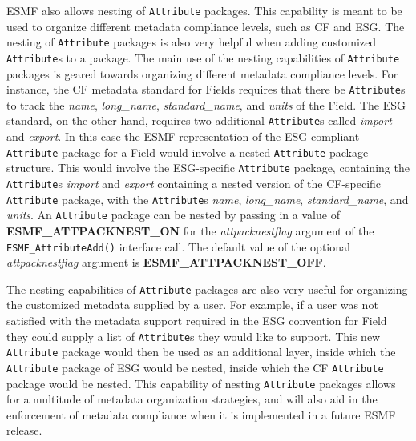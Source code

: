 \vspace{18pt}

ESMF also allows nesting of {\tt Attribute} packages.  This capability is meant to be used to organize different metadata compliance levels, such as CF and ESG.  The nesting of {\tt Attribute} packages is also very helpful when adding customized {\tt Attribute}s to a package.  The main use of the nesting capabilities of {\tt Attribute} packages is geared towards organizing different metadata compliance levels.  For instance, the CF metadata standard for Fields requires that there be {\tt Attribute}s to track the {\it name}, {\it long\_name}, {\it standard\_name}, and {\it units} of the Field.  The ESG standard, on the other hand, requires two additional {\tt Attribute}s called {\it import} and {\it export}.  In this case the ESMF representation of the ESG compliant {\tt Attribute} package for a Field would involve a nested {\tt Attribute} package structure.  This would involve the ESG-specific {\tt Attribute} package, containing the {\tt Attribute}s {\it import} and {\it export} containing a nested version of the CF-specific {\tt Attribute} package, with the {\tt Attribute}s {\it name}, {\it long\_name}, {\it standard\_name}, and {\it units}.  An {\tt Attribute} package can be nested by passing in a value of {\bf ESMF\_ATTPACKNEST\_ON} for the {\it attpacknestflag} argument of the {\tt ESMF\_AttributeAdd()} interface call.  The default value of the optional {\it attpacknestflag} argument is {\bf ESMF\_ATTPACKNEST\_OFF}.

The nesting capabilities of {\tt Attribute} packages are also very useful for organizing the customized metadata supplied by a user.  For example, if a user was not satisfied with the metadata support required in the ESG convention for Field they could supply a list of {\tt Attribute}s they would like to support.  This new {\tt Attribute} package would then be used as an additional layer, inside which the {\tt Attribute} package of ESG would be nested, inside which the CF {\tt Attribute} package would be nested.  This capability of nesting {\tt Attribute} packages allows for a multitude of metadata organization strategies, and will also aid in the enforcement of metadata compliance when it is implemented in a future ESMF release.



